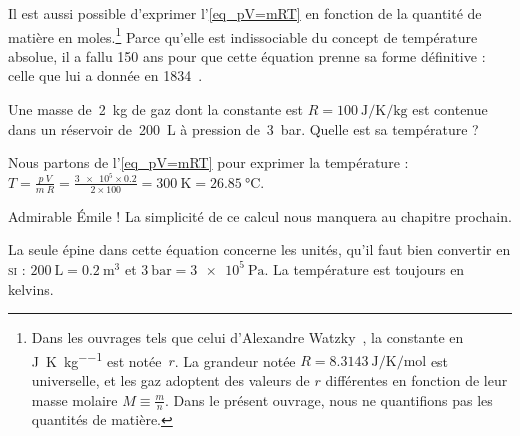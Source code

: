 		Il est aussi possible d’exprimer l’\cref{eq_pV=mRT} en fonction de la quantité de matière en \si{moles}.\footnote{Dans les ouvrages tels que celui d’Alexandre Watzky~\cite{watzky2007}, la constante en \si{\joule\per\kelvin\per\kilogram} est notée~$r$. La grandeur notée $R = \SI{8,3143}{\joule\per\kelvin\per\mole}$ est universelle, et les gaz adoptent des valeurs de $r$ différentes en fonction de leur masse molaire $M \equiv \frac{m}{n}$. Dans le présent ouvrage, nous ne quantifions pas les quantités de matière.}
		 Parce qu’elle est indissociable du concept de température absolue, il a fallu 150 ans pour que cette équation prenne sa forme définitive : celle que lui a donnée  en 1834~\cite{clapeyron1834}.

			\begin{anexample}
				Une masse de~\SI{2}{\kilogram} de gaz dont la constante est $R = \SI{100}{\joule\per\kelvin\per\kilogram}$ est contenue dans un réservoir de~\SI{200}{\liter} à pression de~\SI{3}{\bar}. Quelle est sa température ?
				\begin{answer}
					Nous partons de l’\cref{eq_pV=mRT} pour exprimer la température : $T = \frac{p \ V}{m \ R} = \frac{\num{3e5} \times \num{0,2}}{2 \times \num{100}} = \SI{300}{\kelvin} = \SI{26,85}{\degreeCelsius}$.
				\end{answer}
					\begin{remark}Admirable Émile ! La simplicité de ce calcul nous manquera au chapitre prochain.\end{remark}
					\begin{remark}La seule épine dans cette équation concerne les unités, qu’il faut bien convertir en \textsc{si} : $\SI{200}{\liter} = \SI{0,2}{\metre\cubed}$ et $\SI{3}{\bar} = \SI{3e5}{\pascal}$. La température est toujours en \si{kelvins}. \end{remark}
			\end{anexample}

